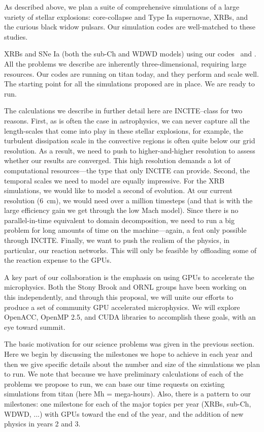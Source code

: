 As described above, we plan a suite of comprehensive simulations of a
large variety of stellar explosions: core-collapse and Type Ia
supernovae, XRBs, and the curious black widow pulsars.  Our simulation
codes are well-matched to these studies.  


XRBs and SNe Ia (both the sub-Ch and WDWD models) using our
codes \maestro\ and \castro.  All the problems we
describe are inherently three-dimensional, requiring large resources.
Our codes are running on titan today, and they perform and scale
well.  The starting point for all the simulations proposed are in
place.  We are ready to run.

The calculations we describe in further detail here are INCITE--class 
for two reasons.  First, as is often the case in astrophysics, we can
never capture all the length-scales that come into play in these
stellar explosions, for example, the turbulent dissipation scale in
the convective regions is often quite below our grid resolution.  As a
result, we need to push to higher-and-higher resolution to assess
whether our results are converged.  This high resolution demands a lot
of computational resources---the type that only INCITE can provide.
Second, the temporal scales we need to model are equally impressive.
For the XRB simulations, we would like to model a second of evolution.
At our current resolution (6~cm), we would need over a million
timesteps (and that is with the large efficiency gain we get through
the low Mach model).  Since there is no parallel-in-time equivalent to
domain decomposition, we need to run a big problem for long amounts of
time on the machine---again, a feat only possible through INCITE.
Finally, we want to push the realism of the physics, in particular,
our reaction networks.  This will only be feasible by offloading some
of the reaction expense to the GPUs.

A key part of our collaboration is the emphasis on using GPUs
to accelerate the microphysics.  Both the Stony Brook and ORNL
groups have been working on this independently, and through this
proposal, we will unite our efforts to produce a set of community
GPU accelerated microphysics.  We will explore OpenACC, OpenMP 2.5,
and CUDA libraries to accomplish these goals, with an eye toward
summit.

The basic motivation for our science problems was given in the
previous section.  Here we begin by discussing the milestones we hope
to achieve in each year and then we give specific details about the
number and size of the simulations we plan to run.  We note that because
we have preliminary calculations of each of the problems we propose to
run, we can base our time requests on existing simulations from titan
(here Mh = mega-hours).  Also, there is a pattern to our milestones:
one milestone for each of the major topics per year (XRBs, sub-Ch,
WDWD, ...) with GPUs toward the end of the year, and the addition of 
new physics in years 2 and 3.  

